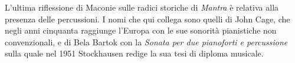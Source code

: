 L'ultima riflessione di Maconie sulle radici storiche di \emph{Mantra} è relativa alla presenza delle percussioni. I nomi che qui collega sono quelli di John Cage, che negli anni cinquanta raggiunge l'Europa con le sue sonorità pianistiche non convenzionali, e di Bela Bartok con la \emph{Sonata per due pianoforti e percussione} sulla quale nel 1951 Stockhausen redige la sua tesi di diploma musicale.


%
%
%
%
%
%
%

%


